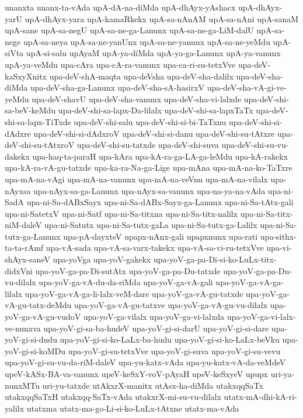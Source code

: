 {unanxta
unanx-ta-vAda
upA-dA-na-diMda
upA-dhAyx-yAshacx
upA-dhAyx-yarU
upA-dhAyx-yara
upA-kamaRkekx
upA-sa-nAnAM
upA-sa-nAni
upA-sanaM
upA-sane
upA-sa-negU
upA-sa-ne-ga-Lanunx
upA-sa-ne-ga-LiM-dalU
upA-sa-nege
upA-sa-neya
upA-sa-ne-yanUnx
upA-sa-ne-yanunx
upA-sa-ne-yeMdu
upA-siVta
upA-si-salu
upAyaM
upA-ya-diMda
upA-ya-ga-Lanunx
upA-ya-vanunx
upA-ya-veMdu
upa-cAra
upa-cA-ra-vanunx
upa-ca-ri-su-tetxVve
upa-deV-kaSxyXnitx
upa-deV-shA-maqta
upa-deVsha
upa-deV-sha-dalilx
upa-deV-sha-diMda
upa-deV-sha-ga-Lanunx
upa-deV-sha-sA-hasirxV
upa-deV-sha-vA-gi-ve-yeMdu
upa-deV-shavU
upa-deV-sha-vanunx
upa-deV-sha-vi-lalxde
upa-deV-shi-sa-beV-keMdu
upa-deV-shi-sa-lapx-Da-lilalx
upa-deV-shi-sa-lapxTaTx
upa-deV-shi-sa-lapx-TiTxde
upa-deV-shi-salu
upa-deV-shi-si-bi-TaTxnu
upa-deV-shi-si-dAdxre
upa-deV-shi-si-dAdxroV
upa-deV-shi-si-danu
upa-deV-shi-su-tAtxre
upa-deV-shi-su-tAtxroV
upa-deV-shi-su-tatxde
upa-deV-shi-suva
upa-deV-shi-su-vu-dakekx
upa-haq-ta-paraH
upa-kAra
upa-kA-ra-ga-LA-ga-leMdu
upa-kA-rakekx
upa-kA-ra-vA-gu-tatxde
upa-ka-ra-Na-ga-Lige
upa-mAna
upa-mA-na-ko-TaTxre
upa-mA-na-vAgi
upa-mA-na-vanunx
upa-mA-na-veVnu
upa-mA-na-vilalx
upa-nAyxsa
upa-nAyx-sa-ga-Lanunx
upa-nAyx-sa-vanunx
upa-na-ya-na-vAda
upa-ni-SadA
upa-ni-Sa-dABxSayx
upa-ni-Sa-dABx-Sayx-ga-Lanunx
upa-ni-Sa-tAtx-gali
upa-ni-SatetxV
upa-ni-Satf
upa-ni-Sa-titxna
upa-ni-Sa-titx-nalilx
upa-ni-Sa-titx-niM-daleV
upa-ni-Satutx
upa-ni-Sa-tutx-gaLa
upa-ni-Sa-tutx-ga-Lalilx
upa-ni-Sa-tutx-ga-Lanunx
upa-pA-dayxteV
upapx-nAnx-gali
upapxnunx
upa-rati
upa-sithx-ta-ta-rAmf
upa-vA-sada
upa-vA-sa-varx-takekx
upa-vA-sa-vi-ru-tetxVve
upa-vi-shAyx-saneV
upa-yoVga
upa-yoV-gakekx
upa-yoV-ga-pa-Di-si-ko-LuLx-titx-didxVni
upa-yoV-ga-pa-Di-sutAtx
upa-yoV-ga-pa-Du-tatxde
upa-yoV-ga-pa-Du-vu-dilalx
upa-yoV-ga-vA-du-da-riMda
upa-yoV-ga-vA-gali
upa-yoV-ga-vA-ga-lilalx
upa-yoV-ga-vA-ga-li-lalx-veM-dare
upa-yoV-ga-vA-gu-tatxde
upa-yoV-ga-vA-gu-tatx-deMdu
upa-yoV-ga-vA-gu-tatxve
upa-yoV-ga-vA-gu-vu-dilalx
upa-yoV-ga-vA-gu-vudoV
upa-yoV-ga-vilalx
upa-yoV-ga-vi-lalxda
upa-yoV-ga-vi-lalx-ve-nunxva
upa-yoV-gi-sa-ba-hudeV
upa-yoV-gi-si-darU
upa-yoV-gi-si-dare
upa-yoV-gi-si-dudu
upa-yoV-gi-si-ko-LaLx-ba-hudu
upa-yoV-gi-si-ko-LaLx-beVku
upa-yoV-gi-si-koMDu
upa-yoV-gi-su-tetxVve
upa-yoV-gi-suva
upa-yoV-gi-su-vevu
upa-yoV-gi-su-vu-da-riM-daleV
upa-yu-katx-vAda
upa-yu-katx-vA-da-veMdeV
upeV-kASx-BA-va-vanunx
upeV-keSxY-voV-pAyaH
upeV-keSxyeV
upupx
uri-ya-nunxMTu
uri-yu-tatxde
utAkxrX-manitx
utAsx-ha-diMda
utakxqqSaTx
utakxqqSaTxH
utakxqq-SaTx-vAda
utakxrX-mi-su-vu-dilalx
utatx-mA-dhi-kA-ri-yalilx
utatxma
utatx-ma-go-Li-si-ko-LuLx-tAtxne
utatx-ma-vAda
}

